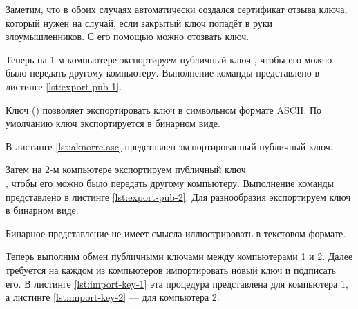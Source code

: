 Заметим, что в обоих случаях автоматически создался сертификат отзыва ключа, который нужен на случай, если закрытый ключ попадёт в руки злоумышленников. С его помощью можно отозвать ключ.

Теперь на 1-м компьютере экспортируем публичный ключ , чтобы его можно было передать другому компьютеру. Выполнение команды представлено в листинге \ref{lst:export-pub-1}.



Ключ  () позволяет экспортировать ключ в символьном формате ASCII. По умолчанию ключ экспортируется в бинарном виде.

В листинге \ref{lst:aknorre.asc} представлен экспортированный публичный ключ.




Затем на 2-м компьютере экспортируем публичный ключ\\ , чтобы его можно было передать другому компьютеру. Выполнение команды представлено в листинге \ref{lst:export-pub-2}. Для разнообразия экспортируем ключ в бинарном виде.



Бинарное представление не имеет смысла иллюстрировать в текстовом формате.

Теперь выполним обмен публичными ключами между компьютерами 1 и 2. Далее требуется на каждом из компьютеров импортировать новый ключ и подписать его. В листинге \ref{lst:import-key-1} эта процедура представлена для компьютера 1, а листинге \ref{lst:import-key-2} --- для компьютера 2.





